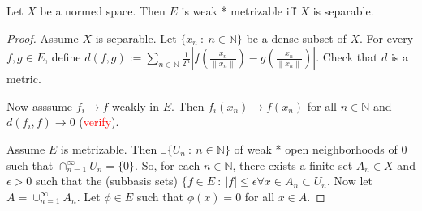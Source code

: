 \begin{theorem}
  Let $X$ be a normed space. Then $E$ is weak * metrizable iff $X$ is separable.
  \marginnote{ \scriptsize \it \textcolor{red}{complete this proof}}
\end{theorem}
\begin{proof}
  Assume $X$ is separable. Let $\{ x_n  \ : \  n \in \mathbb{N} \}$
  be a dense subset of $X$. For every $f, g \in E$, define $d(f, g)
  := \sum_{n \in \mathbb{N}}  \frac{1}{2^n}|f( \frac{x_n}{\|x_n\|}) -
  g( \frac{x_n}{\|x_n\|} )|$. Check that $d$ is a metric.

  Now asssume $f_i \to f$ weakly in $E$. Then $f_i(x_n) \to f(x_n)$
  for all $n \in \mathbb{N}$ and $d(f_i, f) \to 0$ (\textcolor{red}{verify}).

  Assume $E$ is metrizable. Then $\exists \{ U_n \ : \ n \in
  \mathbb{N} \}$ of weak * open neighborhoods of $0$ such that
  $\cap_{n = 1}^{\infty}U_n = \{ 0 \}$. So, for each $ n \in
  \mathbb{N}$, there exists a finite set $ A_n \in X$ and $\epsilon
  > 0$ such that the (subbasis sets) $\{ f \in E \ : \ |f|\le
    \epsilon \forall x \in A_n  \subset U_n$. Now let $A = \cup_{n
    = 1}^{\infty}A_n$. Let $\phi \in E$ such that $\phi(x) = 0$ for
    all $x \in A$.
  \end{proof}
